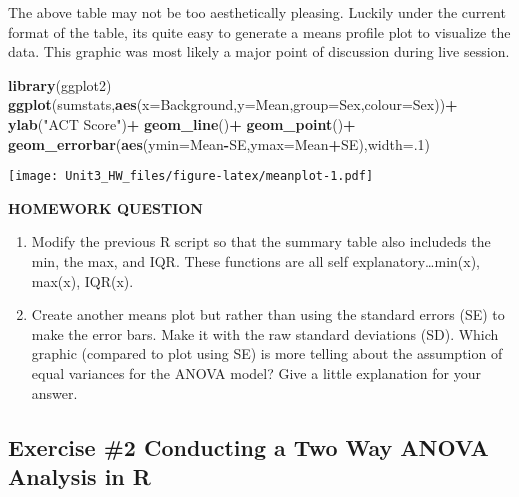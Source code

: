 \documentclass[]{article}
\newenvironment{Shaded}{\begin{snugshade}}{\end{snugshade}}
\newcommand{\DataTypeTok}[1]{\textcolor[rgb]{0.13,0.29,0.53}{#1}}
\newcommand{\DecValTok}[1]{\textcolor[rgb]{0.00,0.00,0.81}{#1}}
\newcommand{\KeywordTok}[1]{\textcolor[rgb]{0.13,0.29,0.53}{\textbf{#1}}}
\newcommand{\NormalTok}[1]{#1}
\newcommand{\OperatorTok}[1]{\textcolor[rgb]{0.81,0.36,0.00}{\textbf{#1}}}
\newcommand{\StringTok}[1]{\textcolor[rgb]{0.31,0.60,0.02}{#1}}
\begin{document}
The above table may not be too aesthetically pleasing. Luckily under the
current format of the table, its quite easy to generate a means profile
plot to visualize the data. This graphic was most likely a major point
of discussion during live session.

\begin{Shaded}
\begin{Highlighting}[]
\KeywordTok{library}\NormalTok{(ggplot2)}
\KeywordTok{ggplot}\NormalTok{(sumstats,}\KeywordTok{aes}\NormalTok{(}\DataTypeTok{x=}\NormalTok{Background,}\DataTypeTok{y=}\NormalTok{Mean,}\DataTypeTok{group=}\NormalTok{Sex,}\DataTypeTok{colour=}\NormalTok{Sex))}\OperatorTok{+}
\StringTok{  }\KeywordTok{ylab}\NormalTok{(}\StringTok{"ACT Score"}\NormalTok{)}\OperatorTok{+}
\StringTok{  }\KeywordTok{geom_line}\NormalTok{()}\OperatorTok{+}
\StringTok{  }\KeywordTok{geom_point}\NormalTok{()}\OperatorTok{+}
\StringTok{  }\KeywordTok{geom_errorbar}\NormalTok{(}\KeywordTok{aes}\NormalTok{(}\DataTypeTok{ymin=}\NormalTok{Mean}\OperatorTok{-}\NormalTok{SE,}\DataTypeTok{ymax=}\NormalTok{Mean}\OperatorTok{+}\NormalTok{SE),}\DataTypeTok{width=}\NormalTok{.}\DecValTok{1}\NormalTok{)}
\end{Highlighting}
\end{Shaded}

\texttt{[image: Unit3\_HW\_files/figure-latex/meanplot-1.pdf]}

\textbf{HOMEWORK QUESTION}

\begin{enumerate}
\def\labelenumi{\arabic{enumi}.}
\item
  Modify the previous R script so that the summary table also includeds
  the min, the max, and IQR. These functions are all self
  explanatory\ldots{}min(x), max(x), IQR(x).
\item
  Create another means plot but rather than using the standard errors
  (SE) to make the error bars. Make it with the raw standard deviations
  (SD). Which graphic (compared to plot using SE) is more telling about
  the assumption of equal variances for the ANOVA model? Give a little
  explanation for your answer.
\end{enumerate}

\hypertarget{exercise-2-conducting-a-two-way-anova-analysis-in-r}{%
\subsection{Exercise \#2 Conducting a Two Way ANOVA Analysis in
R}\label{exercise-2-conducting-a-two-way-anova-analysis-in-r}}
\end{document}
